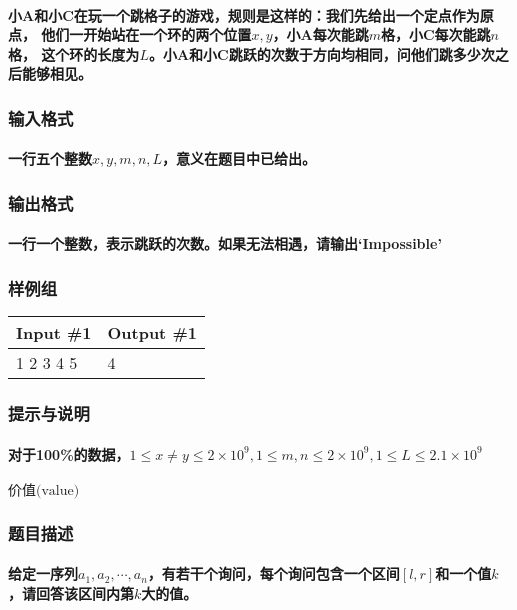 \documentclass[final,11pt,oneside,UTF8]{report}
\begin{document}
\paragraph{
    小A和小C在玩一个跳格子的游戏，规则是这样的：我们先给出一个定点作为原点，
    他们一开始站在一个环的两个位置$x,y$，小A每次能跳$m$格，小C每次能跳$n$格，
    这个环的长度为$L$。小A和小C跳跃的次数于方向均相同，问他们跳多少次之后能够相见。
}
\subsubsection{输入格式}
\paragraph{
    一行五个整数$x,y,m,n,L$，意义在题目中已给出。
}
\subsubsection{输出格式}
\paragraph{
    一行一个整数，表示跳跃的次数。如果无法相遇，请输出`Impossible'
}
\subsubsection{样例组}
\begin{table}[H]
    \begin{tabular}{|l|l|}
    \hline
    Input \#1 & Output \#1 \\ \hline
    1 2 3 4 5 & 4          \\ \hline
    \end{tabular}
    \end{table}
\subsubsection{提示与说明}
\paragraph{
    对于100\%的数据，$1\leq x\neq y \leq 2\times 10^9,1\leq m,n\leq 2\times 10^9,1\leq L \leq 2.1\times 10^9$
}
\newpage
\centerline{\LARGE{$\textbf{价值}\text{(value)}$}}
\subsubsection{题目描述}
\paragraph{
    给定一序列$a_1,a_2,\cdots,a_n$，有若干个询问，每个询问包含一个区间$[l,r]$和一个值$k$，请回答该区间内第$k$大的值。
}
\end{document}
